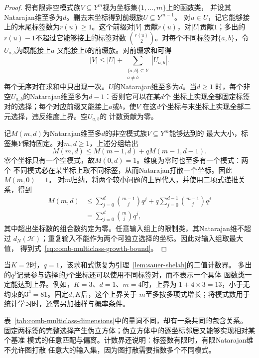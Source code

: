 \begin{proof}
将有限非空模式族\(V\subseteq Y^m\)视为坐标集\(\{1,\ldots,m\}\)上的函数类，
并设其Natarajan维至多为\(d\)。删去末坐标得到前缀族\(U\subseteq Y^{m-1}\)。
对\(u\in U\)，记它能够接上的末尾标签数为\(r(u)\geq1\)。这个前缀对\(|V|\)
贡献\(r(u)\)，对\(|U|\)贡献\(1\)；多出的\(r(u)-1\)不超过它能够接上的标签对数
\(\binom{r(u)}2\)。对每个不同标签对\(\{a,b\}\)，令\(U_{a,b}\)为既能接上\(a\)
又能接上\(b\)的前缀族。对前缀求和可得
\[
  |V|\leq |U|+\sum_{\substack{\{a,b\}\subseteq Y\\a\neq b}}|U_{a,b}|.
\]
每个无序对在求和中只出现一次。\(U\)的Natarajan维至多为\(d\)。当\(d\geq1\)
时，每个非空\(U_{a,b}\)的Natarajan维至多为\(d-1\)：否则它可以在某\(d\)个
坐标上实现全部固定标签对的选择；每个对应前缀又能接上\(a\)或\(b\)，使\(V\)
在这\(d\)个坐标与末坐标上实现全部二元选择，违反维度上界。空\(U_{a,b}\)的
计数贡献为零。

记\(M(m,d)\)为Natarajan维至多\(d\)的非空模式族\(V\subseteq Y^m\)能够达到的
最大大小，标签集\(Y\)保持固定。对\(m,d\geq1\)，上述分组给出
\[
  M(m,d)\leq M(m-1,d)+qM(m-1,d-1).
\]
零个坐标只有一个空模式，故\(M(0,d)=1\)。维度为零时也至多有一个模式：两个
不同模式必在某坐标上取不同标签，从而Natarajan打散一个坐标。因此\(M(m,0)=1\)。
对\(m\)归纳，将两个较小问题的上界代入，并使用二项式递推关系，得到
\[
\begin{aligned}
  M(m,d)
  &\leq\sum_{j=0}^{d}\binom{m-1}{j}q^j
       +q\sum_{j=0}^{d-1}\binom{m-1}{j}q^j\\
  &=\sum_{j=0}^{d}\binom mj q^j,
\end{aligned}
\]
其中超出坐标数的组合数约定为零。任意输入组上的限制类，其Natarajan维不超过
\(d_N(\mathcal H)\)；重复输入不能作为两个可独立选择的坐标。因此对输入组取最大值，
得到式~\eqref{eq:comb-multiclass-growth-bound}。
\end{proof}

当\(K=2\)时，\(q=1\)，该求和式恢复为引理~\ref{lem:sauer-shelah}的二值计数界。
多出的\(q^j\)记录参与选择的\(j\)个坐标还可以使用不同标签对，而不表示一个具体
函数类一定能达到上界。例如，\(K=3\)、\(d=1\)、\(m=4\)时，上界为
\(1+4\times3=13\)，小于无约束的\(3^4=81\)。固定\(d,K\)后，这个上界关于
\(m\)至多按多项式增长；将模式数用于统计学习时，还需另加抽样与概率条件。

表~\ref{tab:comb-multiclass-dimensions}中的量词不同，却有一条共同的包含关系。
固定两标签的完整选择产生伪立方体；伪立方体中的逐坐标邻居又能够实现相对某个基准
模式的任意匹配与偏离。计数界还说明：标签数有限时，有限Natarajan维不允许图打散
任意大的输入集，因为图打散需要指数多个不同模式。

